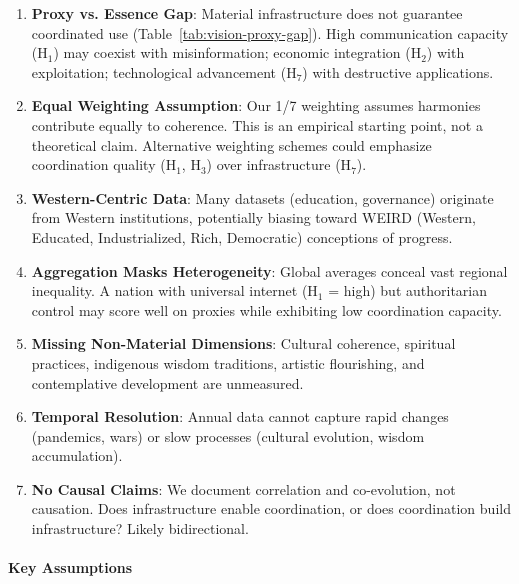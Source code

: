 \documentclass[11pt]{article}
\begin{document}
\begin{enumerate}
\item \textbf{Proxy vs. Essence Gap}: Material infrastructure does not guarantee
coordinated use (Table~\ref{tab:vision-proxy-gap}). High communication capacity
(H$_1$) may coexist with misinformation; economic integration (H$_2$) with
exploitation; technological advancement (H$_7$) with destructive applications.

\item \textbf{Equal Weighting Assumption}: Our 1/7 weighting assumes harmonies
contribute equally to coherence. This is an empirical starting point, not a
theoretical claim. Alternative weighting schemes could emphasize coordination
quality (H$_1$, H$_3$) over infrastructure (H$_7$).

\item \textbf{Western-Centric Data}: Many datasets (education, governance)
originate from Western institutions, potentially biasing toward WEIRD (Western,
Educated, Industrialized, Rich, Democratic) conceptions of progress.

\item \textbf{Aggregation Masks Heterogeneity}: Global averages conceal vast
regional inequality. A nation with universal internet (H$_1$ = high) but
authoritarian control may score well on proxies while exhibiting low
coordination capacity.

\item \textbf{Missing Non-Material Dimensions}: Cultural coherence, spiritual
practices, indigenous wisdom traditions, artistic flourishing, and contemplative
development are unmeasured.

\item \textbf{Temporal Resolution}: Annual data cannot capture rapid changes
(pandemics, wars) or slow processes (cultural evolution, wisdom accumulation).

\item \textbf{No Causal Claims}: We document correlation and co-evolution, not
causation. Does infrastructure enable coordination, or does coordination build
infrastructure? Likely bidirectional.
\end{enumerate}

\paragraph{Key Assumptions}
\end{document}
